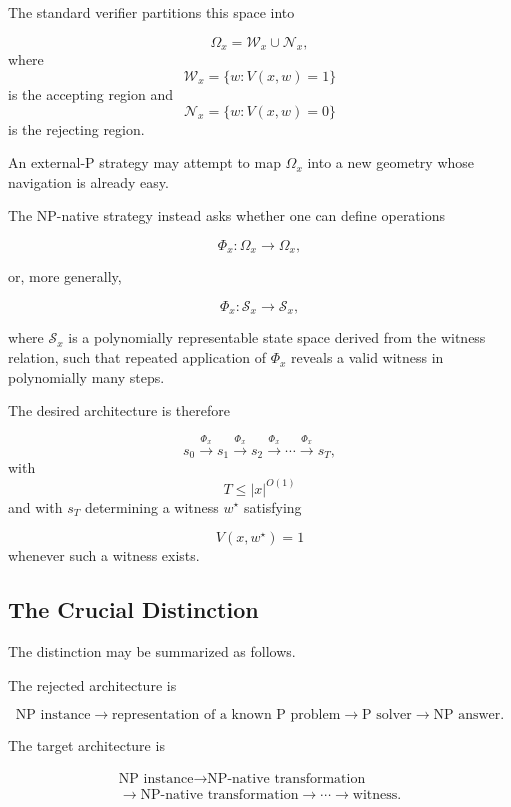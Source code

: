 \documentclass[11pt]{article}
\theoremstyle{plain}
\theoremstyle{definition}
\begin{document}
The standard verifier partitions this space into

\[
    \Omega_x
    =
    \mathcal{W}_x
    \cup
    \mathcal{N}_x,
\]
where
\[
    \mathcal{W}_x
    =
    \{w:V(x,w)=1\}
\]
is the accepting region and
\[
    \mathcal{N}_x
    =
    \{w:V(x,w)=0\}
\]
is the rejecting region.

An external-P strategy may attempt to map \(\Omega_x\) into a new geometry
whose navigation is already easy.

The NP-native strategy instead asks whether one can define operations

\[
    \Phi_x:\Omega_x\to\Omega_x,
\]

or, more generally,

\[
    \Phi_x:
    \mathcal{S}_x
    \to
    \mathcal{S}_x,
\]

where \(\mathcal{S}_x\) is a polynomially representable state space derived
from the witness relation, such that repeated application of \(\Phi_x\)
reveals a valid witness in polynomially many steps.

The desired architecture is therefore

\[
    s_0
    \xrightarrow{\Phi_x}
    s_1
    \xrightarrow{\Phi_x}
    s_2
    \xrightarrow{\Phi_x}
    \cdots
    \xrightarrow{\Phi_x}
    s_T,
\]
with
\[
    T\leq |x|^{O(1)}
\]
and with \(s_T\) determining a witness \(w^\star\) satisfying

\[
    V(x,w^\star)=1
\]
whenever such a witness exists.

\subsection{The Crucial Distinction}

The distinction may be summarized as follows.

The rejected architecture is

\[
\boxed{
\text{NP instance}
\longrightarrow
\text{representation of a known P problem}
\longrightarrow
\text{P solver}
\longrightarrow
\text{NP answer}.
}
\]

The target architecture is

\[
\boxed{\begin{gathered}
\text{NP instance}\longrightarrow\text{NP-native transformation}\\
\longrightarrow\text{NP-native transformation}\longrightarrow\cdots\longrightarrow\text{witness}.
\end{gathered}}
\]
\end{document}
